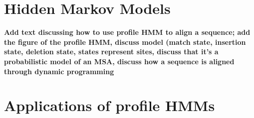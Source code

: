 

\section{Hidden Markov Models}\label{back:hmm}

\textbf{Add text discussing how to use profile HMM to align a sequence; add the figure of the profile HMM, discuss model (match state, insertion state, deletion state, states represent sites, discuss that it's a probabilistic model of an MSA, discuss how a sequence is aligned through dynamic programming}
\section{Applications of profile HMMs}\label{back:app}
